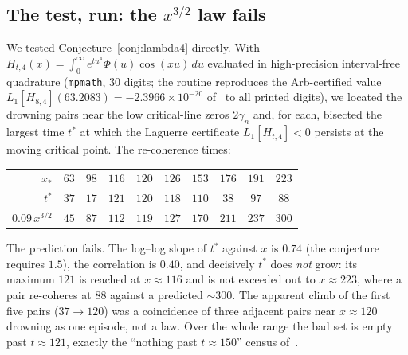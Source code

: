 \documentclass[11pt,reqno]{amsart}
\theoremstyle{plain}
\theoremstyle{definition}
\theoremstyle{remark}
\begin{document}
\subsection{The test, run: the $x^{3/2}$ law fails}\label{sec:test}
We tested Conjecture~\ref{conj:lambda4} directly. With
$H_{t,4}(x)=\int_0^\infty e^{tu^4}\Phi(u)\cos(xu)\,du$ evaluated in
high-precision interval-free quadrature (\texttt{mpmath}, $30$ digits;
the routine reproduces the Arb-certified value $L_1[H_{8,4}](63.2083)=
-2.3966\times10^{-20}$ of~\cite{FontesIBM} to all printed digits), we
located the drowning pairs near the low critical-line zeros $2\gamma_n$
and, for each, bisected the largest time $t^\ast$ at which the Laguerre
certificate $L_1[H_{t,4}]<0$ persists at the moving critical point. The
re-coherence times:
\begin{center}
\begin{tabular}{r|ccccccccc}
\hline
$x_\ast$ & $63$ & $98$ & $116$ & $120$ & $126$ & $153$ & $176$ & $191$ & $223$\\
$t^\ast$ & $37$ & $17$ & $121$ & $120$ & $118$ & $110$ & $38$ & $97$ & $88$\\
$0.09\,x^{3/2}$ & $45$ & $87$ & $112$ & $119$ & $127$ & $170$ & $211$ & $237$ & $300$\\
\hline
\end{tabular}
\end{center}
The prediction fails. The log--log slope of $t^\ast$ against $x$ is
$0.74$ (the conjecture requires $1.5$), the correlation is $0.40$, and
decisively $t^\ast$ does \emph{not} grow: its maximum $121$ is reached at
$x\approx116$ and is not exceeded out to $x\approx223$, where a pair
re-coheres at $88$ against a predicted $\sim300$. The apparent climb of
the first five pairs ($37\to120$) was a coincidence of three adjacent
pairs near $x\approx120$ drowning as one episode, not a law. Over the
whole range the bad set is empty past $t\approx121$, exactly the
``nothing past $t\approx150$'' census of~\cite{FontesIBM}.
\end{document}
